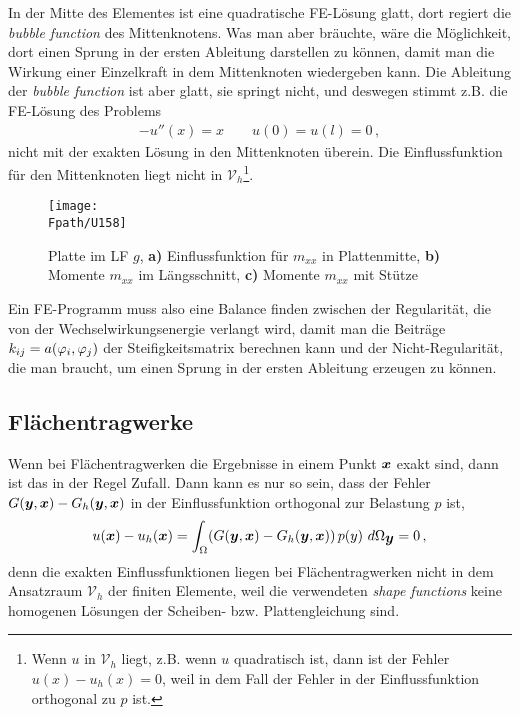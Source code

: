 {In der Mitte des Elementes ist eine quadratische FE-L\"{o}sung glatt, dort regiert die {\em bubble function\/} des Mittenknotens. Was man aber br\"{a}uchte, w\"{a}re die M\"{o}glichkeit, dort einen Sprung in der ersten Ableitung darstellen zu k\"{o}nnen, damit man die Wirkung einer Einzelkraft in dem Mittenknoten wiedergeben kann. Die Ableitung der {\em bubble function\/} ist aber glatt, sie springt nicht, und deswegen stimmt z.B. die FE-L\"{o}sung des Problems
\begin{align}
- u''(x) = x \qquad u(0) = u(l) = 0\,,
\end{align}
nicht mit der exakten L\"{o}sung in den Mittenknoten \"{u}berein. Die Einflussfunktion f\"{u}r den Mittenknoten liegt nicht in $\mathcal{V}_h$\footnote{Wenn $u$ in $\mathcal{V}_h$ liegt, z.B. wenn $u$ quadratisch ist, dann ist der Fehler $u(x) - u_h(x) = 0$, weil in dem Fall der Fehler in der Einflussfunktion orthogonal zu $p$ ist.}.
\begin{figure}[tbp]
\centering
\texttt{[image: \\Fpath/U158]}
\caption{Platte im LF $g$, \textbf{ a)} Einflussfunktion f\"{u}r $m_{xx}$ in Plattenmitte, \textbf{ b)} Momente $m_{xx}$ im L\"{a}ngsschnitt, \textbf{ c)} Momente $m_{xx}$ mit St\"{u}tze} \label{U158}
\end{figure}%

Ein FE-Programm muss also eine Balance finden zwischen der Regularit\"{a}t, die von der Wechselwirkungsenergie verlangt wird, damit man die Beitr\"{a}ge $k_{ij} = a(\varphi_i,\varphi_j) $ der Steifigkeitsmatrix berechnen kann und der \glq Nicht-Regularit\"{a}t\grq{}, die man braucht, um einen Sprung in der ersten Ableitung erzeugen zu k\"{o}nnen.

{\textcolor{sectionTitleBlue}{\section{Fl\"{a}chentragwerke}}}
Wenn bei Fl\"{a}chentragwerken die Ergebnisse in einem Punkt $\mbox{\boldmath $x$}$ exakt sind, dann ist das in der Regel Zufall. Dann kann es nur so sein, dass der Fehler $G(\mbox{\boldmath $y$},\mbox{\boldmath $x$}) - G_h(\mbox{\boldmath $y$},\mbox{\boldmath $x$})$ in der Einflussfunktion orthogonal zur Belastung $p$ ist,
\begin{align}
u(\mbox{\boldmath $x$}) - u_h(\mbox{\boldmath $x$}) = \int_{\Omega} (G(\mbox{\boldmath $y$},\mbox{\boldmath $x$}) - G_h(\mbox{\boldmath $y$},\mbox{\boldmath $x$}))\,p(y)\,\,d\Omega_{\mbox{\boldmath $y$}} = 0\,,
\end{align}
denn die exakten Einflussfunktionen liegen bei Fl\"{a}chentragwerken nicht in dem Ansatzraum $\mathcal{V}_h$ der finiten Elemente, weil die verwendeten {\em shape functions\/} keine homogenen L\"{o}sungen der Scheiben- bzw. Plattengleichung sind.

}
